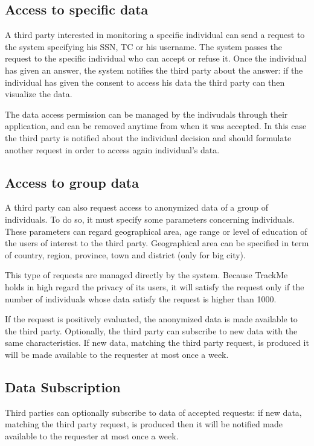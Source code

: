\subsection{Access to specific data}
A third party interested in monitoring a specific individual can send a request to the system specifying his SSN, TC or his username.
The system passes the request to the specific individual who can accept or refuse it.
Once the individual has given an answer, the system notifies the third party about the answer: if the individual has given the consent to access his data the third party can then visualize the data.

The data access permission can be managed by the indivudals through their application, and can be removed anytime from when it was accepted. 
In this case the third party is notified about the individual decision and should formulate another request in order to access again individual's data. 




\subsection{Access to group data}
A third party can also request access to anonymized data of a group of individuals.
To do so, it must specify some parameters concerning individuals. These parameters can regard geographical area, age range or level of education of the users of interest to the third party.
Geographical area can be specified in term of country, region, province, town and district (only for big city).

This type of requests are managed directly by the system. Because TrackMe holds in high regard the privacy of its users, it will satisfy the request only if the number of individuals whose data satisfy the request is higher than 1000.

If the request is positively evaluated, the anonymized data is made available to the third party.
Optionally, the third party can subscribe to new data with the same characteristics. If new data, matching the third party request, is produced it will be made available to the requester at most once a week.

\subsection{Data Subscription}
Third parties can optionally subscribe to data of accepted requests: if new data, matching the third party request, is produced then it will be notified made available to the requester at most once a week.

